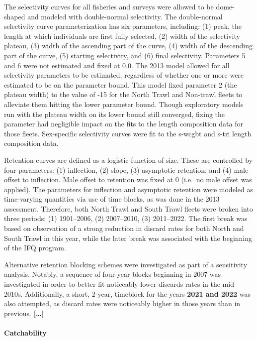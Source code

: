 \documentclass[11pt,
  english,
  letterpaper,
]{article}
\begin{document}
The selectivity curves for all fisheries and surveys were allowed to be dome-shaped and modeled with double-normal selectivity. The double-normal selectivity curve parameterization has six parameters, including: (1) peak, the length at which individuals are first fully selected, (2) width of the selectivity plateau, (3) width of the ascending part of the curve, (4) width of the descending part of the curve, (5) starting selectivity, and (6) final selectivity. Parameters 5 and 6 were not estimated and fixed at 0.0. The 2013 model allowed for all selectivity parameters to be estimated, regardless of whether one or more were estimated to be on the parameter bound. This model fixed parameter 2 (the plateau width) to the value of -15 for the North Trawl and Non-trawl fleets to alleviate them hitting the lower parameter bound. Though exploratory models run with the plateau width on its lower bound still converged, fixing the parameter had negligible impact on the fits to the length composition data for those fleets. Sex-specific selectivity curves were fit to the \gls{s-wcgbt} and \gls{s-tri} length composition data.

Retention curves are defined as a logistic function of size. These are controlled by four parameters: (1) inflection, (2) slope, (3) asymptotic retention, and (4) male offset to inflection. Male offset to retention was fixed at 0 (i.e.~no male offset was applied). The parameters for inflection and asymptotic retention were modeled as time-varying quantities via use of time blocks, as was done in the 2013 assessment. Therefore, both North Trawl and South Trawl fleets were broken into three periods: (1) 1901--2006, (2) 2007--2010, (3) 2011--2022. The first break was based on observation of a strong reduction in discard rates for both North and South Trawl in this year, while the later break was associated with the beginning of the IFQ program.

Alternative retention blocking schemes were investigated as part of a sensitivity analysis. Notably, a sequence of four-year blocks beginning in 2007 was investigated in order to better fit noticeably lower discards rates in the mid 2010s. Additionally, a short, 2-year, timeblock for the years \textbf{2021 and 2022} was also attempted, as discard rates were noticeably higher in those years than in previous. \textbf{{[}\ldots{]}}

\hypertarget{catchability}{%
\paragraph{Catchability}\label{catchability}}
\end{document}
